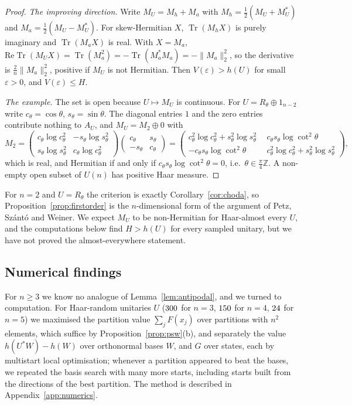 \documentclass[11pt]{article}
\DeclareMathOperator{\Tr}{Tr}
\newcommand{\Z}{\mathbb{Z}}
\theoremstyle{plain}
\theoremstyle{definition}
\theoremstyle{remark}
\begin{document}
\begin{proof}
\emph{The improving direction.} Write $M_U=M_h+M_a$ with $M_h=\frac12(M_U+M_U^*)$ and $M_a=\frac12(M_U-M_U^*)$. For skew-Hermitian $X$,
$\Tr(M_hX)$ is purely imaginary and $\Tr(M_aX)$ is real. With $X=M_a$, $\mathrm{Re}\Tr(M_UX)=\Tr(M_a^2)=-\Tr(M_a^*M_a)=-\|M_a\|_2^2$,
so the derivative is $\frac2n\|M_a\|_2^2$, positive if $M_U$ is not Hermitian. Then $V(\varepsilon)>h(U)$ for small $\varepsilon>0$, and
$V(\varepsilon)\le H$.

\emph{The example.} The set is open because $U\mapsto M_U$ is continuous. For $U=R_\theta\oplus1_{n-2}$ write
$c_\theta=\cos\theta$, $s_\theta=\sin\theta$. The diagonal entries $1$ and the zero entries contribute nothing to $A_U$, and
$M_U=M_2\oplus0$ with
\[
  M_2=\begin{pmatrix}c_\theta\log c_\theta^2&-s_\theta\log s_\theta^2\\ s_\theta\log s_\theta^2&c_\theta\log c_\theta^2\end{pmatrix}
      \begin{pmatrix}c_\theta&s_\theta\\-s_\theta&c_\theta\end{pmatrix}
     =\begin{pmatrix}c_\theta^2\log c_\theta^2+s_\theta^2\log s_\theta^2&\ \ c_\theta s_\theta\log\cot^2\theta\\
       -c_\theta s_\theta\log\cot^2\theta&\ \ c_\theta^2\log c_\theta^2+s_\theta^2\log s_\theta^2\end{pmatrix},
\]
which is real, and Hermitian if and only if $c_\theta s_\theta\log\cot^2\theta=0$, i.e.\ $\theta\in\frac\pi4\Z$. A non-empty open subset of $U(n)$ has
positive Haar measure.
\end{proof}

For $n=2$ and $U=R_\theta$ the criterion is exactly Corollary~\ref{cor:choda}, so Proposition~\ref{prop:firstorder} is the
$n$-dimensional form of the argument of Petz, Sz\'ant\'o and Weiner. We expect $M_U$ to be non-Hermitian for Haar-almost
every $U$, and the computations below find $H>h(U)$ for every sampled unitary, but we have not proved the almost-everywhere
statement.

\subsection{Numerical findings}

For $n\ge3$ we know no analogue of Lemma~\ref{lem:antipodal}, and we turned to computation. For Haar-random unitaries $U$
($300$ for $n=3$, $150$ for $n=4$, $24$ for $n=5$) we maximised the partition value
$\sum_jF(x_j)$ over partitions with $n^2$ elements, which suffice by Proposition~\ref{prop:psw}(b), and separately the value
$h(U^*W)-h(W)$ over orthonormal bases $W$, and $G$ over states, each by multistart local optimisation; whenever a
partition appeared to beat the bases, we repeated the basis search with many more starts, including starts built from
the directions of the best partition. The method is described in Appendix~\ref{app:numerics}.
\end{document}
